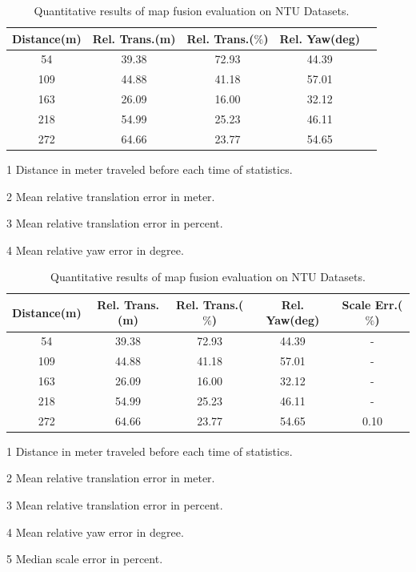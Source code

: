 \begin{table}
	\centering
	\caption{Quantitative results of map fusion evaluation on  NTU Datasets.}
	\begin{threeparttable}
		\begin{tabular}{|c|c|c|c|c|}
			\hline
			Distance(m)\tnote{1} & Rel. Trans.(m)\tnote{2}  & Rel. Trans.($\%$)\tnote{3} & Rel. Yaw(deg)\tnote{4}  \\
			\hline
			54& 39.38 & 72.93 & 44.39 \\
			\hline
			109&44.88& 41.18 & 57.01  \\
			\hline
			163&26.09& 16.00 & 32.12  \\
			\hline
			218&54.99& 25.23 & 46.11  \\
			\hline
			272&64.66& 23.77 & 54.65 \\
			\hline
		\end{tabular}
		\begin{tablenotes}
			\footnotesize
			\item[1] Distance in meter traveled before each time of statistics. 
			\item[2] Mean relative translation error in meter.
			\item[3] Mean relative translation error in percent.
			\item[4] Mean relative yaw error in degree.
		\end{tablenotes}
	
	\ifoutputscaleerror
			\begin{tabular}{|c|c|c|c|c|}
		\hline
		Distance(m)\tnote{1} & Rel. Trans.(m)\tnote{2}  & Rel. Trans.($\%$)\tnote{3} & Rel. Yaw(deg)\tnote{4} & Scale Err.($\%$)\tnote{5}  \\
		\hline
		54& 39.38 & 72.93 & 44.39& - \\
		\hline
		109&44.88& 41.18 & 57.01 & - \\
		\hline
		163&26.09& 16.00 & 32.12 & - \\
		\hline
		218&54.99& 25.23 & 46.11 & - \\
		\hline
		272&64.66& 23.77 & 54.65 & 0.10\\
		\hline
	\end{tabular}
	\begin{tablenotes}
		\footnotesize
		\item[1] Distance in meter traveled before each time of statistics. 
		\item[2] Mean relative translation error in meter.
		\item[3] Mean relative translation error in percent.
		\item[4] Mean relative yaw error in degree.
		\item[5] Median scale error in percent.
	\end{tablenotes}
\fi
	\end{threeparttable}
	\label{tbl:ntuquanresult}
\end{table}
